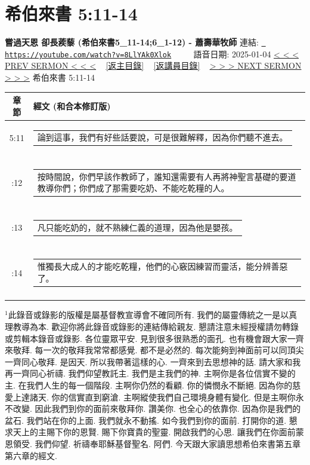 \documentclass{book}
\begin{document}
\section{希伯來書 5:11-14}
\label{sec:8LlYAk0Xlok}
\textbf{嘗過天恩 卻長蒺藜 (希伯來書5\_11-14;6\_1-12) - 蕭壽華牧師}
\newline
\newline
連結: \href{https://youtube.com/watch?v=8LlYAk0Xlok}{\texttt{ https://youtube.com/watch?v=8LlYAk0Xlok}} ~~~~ 語音日期: 2025-01-04 
\newline
\newline
\hyperref[sec:toZa1ewaUWE]{< < < PREV SERMON < < <}
~
\hyperlink{toc}{[返主目錄]}
~
\hyperref[ch:preacher7]{[返講員目錄]}
~
\hyperref[sec:QwQqFfjJiJo]{> > > NEXT SERMON > > >}
\newline
\newline
希伯來書 5:11-14
\newline
\begin{longtable}{cl}
\hline
\hline
章節 & 經文 (和合本修訂版)\\
\hline
5:11 & \begin{tabularx}{0.7\textwidth}{X} 論到這事，我們有好些話要說，可是很難解釋，因為你們聽不進去。 \end{tabularx} \\ \\ \relax
5:12 & \begin{tabularx}{0.7\textwidth}{X} 按時間說，你們早該作教師了，誰知還需要有人再將神聖言基礎的要道教導你們；你們成了那需要吃奶、不能吃乾糧的人。 \end{tabularx} \\ \\ \relax
5:13 & \begin{tabularx}{0.7\textwidth}{X} 凡只能吃奶的，就不熟練仁義的道理，因為他是嬰孩。 \end{tabularx} \\ \\ \relax
5:14 & \begin{tabularx}{0.7\textwidth}{X} 惟獨長大成人的才能吃乾糧，他們的心竅因練習而靈活，能分辨善惡了。 \end{tabularx} \\ \\
[1ex]
\hline
\hline
\end{longtable}
$^{1}$此錄音或錄影的版權是屬基督教宣導會不確同所有.
我們的屬靈傳統之一是以真理教導為本.
歡迎你將此錄音或錄影的連結傳給親友.
懇請注意未經授權請勿轉錄或剪輯本錄音或錄影.
各位靈眾平安.
見到很多很熟悉的面孔.
也有機會跟大家一齊來敬拜.
每一次的敬拜我常常都感覺.
都不是必然的.
每次能夠到神面前可以同頂尖一齊同心敬拜.
是因天.
所以我帶著這樣的心.
一齊來到去思想神的話.
請大家和我再一齊同心祈禱.
我們仰望教託主.
我們是主我們的神.
主啊你是各位信實不變的主.
在我們人生的每一個階段.
主啊你仍然的看顧.
你的憐憫永不斷絕.
因為你的慈愛上達諸天.
你的信實直到窮滄.
主啊縱使我們自己環境身體有變化.
但是主啊你永不改變.
因此我們到你的面前來敬拜你.
讚美你.
也全心的依靠你.
因為你是我們的盆石.
我們站在你的上面.
我們就永不動搖.
如今我們到你的面前.
打開你的道.
懇求天上的主賜下你的恩賢.
賜下你寶貴的聖靈.
開啟我們的心思.
讓我們在你面前蒙恩領受.
我們仰望.
祈禱奉耶穌基督聖名.
阿們.
今天跟大家讀思想希伯來書第五章第六章的經文.
\end{document}
